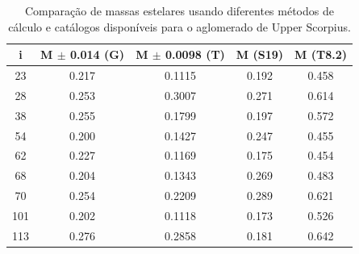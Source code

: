 \begin{table}[htbp]
\centering
\caption[Resultados de massas estelares para Upper Scorpius]{Comparação de massas estelares usando diferentes métodos de cálculo e catálogos disponíveis para o aglomerado de Upper Scorpius.}
\label{tab:usco_massas}
\begin{tabular}{ccccc}
\hline
{i} & {M $\pm$ 0.014 (G)} & {M $\pm$ 0.0098 (T)} & {M (S19)} & {M (T8.2)} \\
\hline
        23  & 0.217 & 0.1115 & 0.192 & 0.458 \\
		28  & 0.253 & 0.3007 & 0.271 & 0.614 \\
		38  & 0.255 & 0.1799 & 0.197 & 0.572 \\
		54  & 0.200 & 0.1427 & 0.247 & 0.455 \\
		62  & 0.227 & 0.1169 & 0.175 & 0.454 \\
		68  & 0.204 & 0.1343 & 0.269 & 0.483 \\
		70  & 0.254 & 0.2209 & 0.289 & 0.621 \\
		101 & 0.202 & 0.1118 & 0.173 & 0.526 \\
		113 & 0.276 & 0.2858 & 0.181 & 0.642 \\
\hline
\end{tabular}
\end{table}
